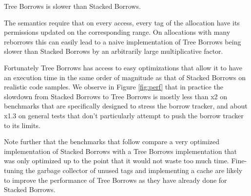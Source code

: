 \documentclass[a4paper,11pt]{article}
\theoremstyle{plain}
\theoremstyle{definition}
\theoremstyle{remark}
\begin{document}
Tree Borrows is slower than Stacked Borrows.

The semantics require that on every access, every tag of the allocation have its
permissions updated on the corresponding range. On allocations with many reborrows
this can easily lead to a naive implementation of Tree Borrows being slower than
Stacked Borrows by an arbitrarily large multiplicative factor.


Fortunately Tree Borrows has access to easy optimizations that allow it to have
an execution time in the same order of magnitude as that of Stacked Borrows on
realistic code samples. We observe in Figure \ref{fig:perf} that in practice the slowdown from Stacked Borrows
to Tree Borrows is mostly less than x2 on benchmarks that are specifically designed
to stress the borrow tracker, and about x1.3 on general tests that don't particularly attempt to
push the borrow tracker to its limits.

Note further that the benchmarks that follow compare a very optimized implementation
of Stacked Borrows with a Tree Borrows implementation that was only optimized up to
the point that it would not waste too much time. Fine-tuning the garbage collector
of unused tags and implementing a cache are likely to improve the performance of
Tree Borrows as they have already done for Stacked Borrows.
\end{document}
